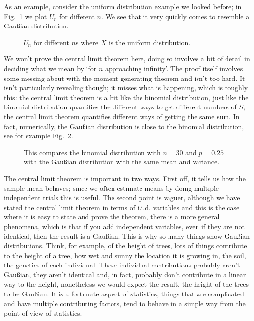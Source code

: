 \documentclass[11pt,a4paper]{scrartcl}
\begin{document}
As an example, consider the uniform distribution example we looked
before; in Fig.~\ref{fig_const} we plot $U_n$ for different $n$. We
see that it very quickly comes to resemble a Gau\ss{}ian distribution.

\begin{figure}[tb]
\begin{center}

\end{center}
\caption{$U_n$ for different $n$s where $X$ is the uniform distribution.\label{fig_const}}
\end{figure}

We won't prove the central limit theorem here, doing so involves a bit
of detail in deciding what we mean by \lq{}for $n$ approaching
infinity\rq{}. The proof itself involves some messing about with the
moment generating theorem and isn't too hard. It isn't particularly
revealing though; it misses what is happening, which is roughly this:
the central limit theorem is a bit like the binomial distribution,
just like the binomial distribution quantifies the different ways to
get different numbers of $S$, the central limit theorem quantifies
different ways of getting the same sum. In fact, numerically, the Gau\ss{}ian
distribution is close to the binomial distribution, see for example Fig.~\ref{fig_binomial}.


\begin{figure}[tb]
\begin{center}

\end{center}
\caption{This compares the binomial distribution with $n=30$ and
  $p=0.25$ with the  Gau\ss{}ian distribution with the same mean and variance.\label{fig_binomial}}
\end{figure}


The central limit theorem is important in two ways. First off, it
tells us how the sample mean behaves; since we often estimate means by
doing multiple independent trials this is useful. The second point is
vaguer, although we have stated the central limit theorem in terms of
i.i.d. variables and this is the case where it is easy to state and
prove the theorem, there is a more general phenomena, which is that if
you add independent variables, even if they are not identical, then
the result is a Gau\ss{}ian. This is why so many things show
Gau\ss{}ian distributions. Think, for example, of the height of trees,
lots of things contribute to the height of a tree, how wet and sunny
the location it is growing in, the soil, the genetics of each
individual. These individual contributions probably aren't
Gau\ss{}ian, they aren't identical and, in fact, probably don't
contribute in a linear way to the height, nonetheless we would expect
the result, the height of the trees to be Gau\ss{}ian. It is a
fortunate aspect of statistics, things that are complicated and have
multiple contributing factors, tend to behave in a simple way from the
point-of-view of statistics.
\end{document}
